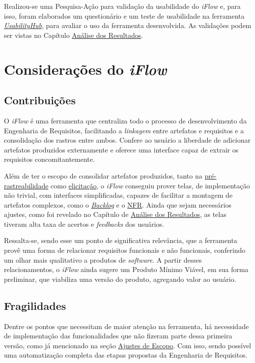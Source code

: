 Realizou-se uma Pesquisa-Ação para validação da usabilidade do \textit{iFlow} e, para isso, foram elaborados um questionário e um teste de usabilidade na ferramenta \href{https://usabilityhub.com/}{\textit{UsabilityHub}}, para avaliar o uso da ferramenta desenvolvida. As validações podem ser vistas no Capítulo \hyperref[chap:analise_resultados]{Análise dos Resultados}.

\section{Considerações do \textit{iFlow}}

\subsection{Contribuições}
O \textit{iFlow} é uma ferramenta que centraliza todo o processo de desenvolvimento da Engenharia de Requisitos, facilitando a \textit{linkagem} entre artefatos e requisitos e a consolidação dos rastros entre ambos. Confere ao usuário a liberdade de adicionar artefatos produzidos externamente e oferece uma interface capaz de extrair os requisitos concomitantemente.

Além de ter o escopo de consolidar artefatos produzidos, tanto na \hyperref[sec:pre-rastreabilidade]{pré-rastreabilidade} como \hyperref[sec:elicitacao]{elicitação}, o \textit{iFlow} conseguiu prover telas, de implementação não trivial, com interfaces simplificadas, capazes de facilitar a montagem de artefatos complexos, como o \hyperref[sec:backlog]{\textit{Backlog}} e o \hyperref[sec:nfr]{NFR}. Ainda que sejam necessários ajustes, como foi revelado no Capítulo de \hyperref[chap:analise_resultados]{Análise dos Resultados}, as telas tiveram alta taxa de acertos e \textit{feedbacks} dos usuários.

Ressalta-se, sendo esse um ponto de significativa relevância, que a ferramenta provê uma forma de relacionar requisitos funcionais e não funcionais, conferindo um olhar mais qualitativo a produtos de \textit{software}. A partir desses relacionamentos, o \textit{iFlow} ainda sugere um Produto Mínimo Viável, em sua forma preliminar, que viabiliza uma versão do produto, agregando valor ao usuário.

\subsection{Fragilidades}

Dentre os pontos que necessitam de maior atenção na ferramenta, há necessidade de implementação das funcionalidades que não fizeram parte dessa primeira versão, como já mencionado na seção \hyperref[sub:corte_de_escopo]{Ajustes de Escopo}. Com isso, sendo possível uma automatização completa das etapas propostas da Engenharia de Requisitos.

